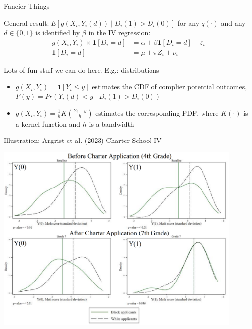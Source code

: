 \documentclass{beamer}
\begin{document}
\begin{frame}{Fancier Things}

General result: $E[g(X_i,Y_i(d))\mid D_i(1)>D_i(0)]$ for any $g(\cdot)$ and any $d\in\{0,1\}$ is identified by $\beta$ in the IV regression:
\begin{align*}
g(X_i,Y_i)\times \mathbf{1}[D_i=d]&=\alpha + \beta\mathbf{1}[D_i=d] + \varepsilon_i\\
\mathbf{1}[D_i=d]&= \mu + \pi Z_i + \nu_i
\end{align*}\pause{}
\vspace{-0.5cm}

Lots of fun stuff we can do here. E.g.: distributions\smallskip
\begin{itemize}
\item $g(X_i,Y_i)=\mathbf{1}[Y_i\le y]$ estimates the CDF of complier potential outcomes, $F(y)=Pr(Y_i(d)<y\mid D_i(1)>D_i(0))$\smallskip
\item $g(X_i,Y_i)=\frac{1}{h}K(\frac{Y_i-y}{h})$ estimates the corresponding PDF, where $K(\cdot)$ is a kernel function and $h$ is a bandwidth 
\end{itemize}

\end{frame}

\begin{frame}{Illustration: Angrist et al. (2023) Charter School IV}
\vspace{-0.2cm}
\begin{center}
	\includegraphics[width=0.9\textwidth]{./lecture_includes/hoee_distribution.png}
\end{center}
\end{frame}
\end{document}
